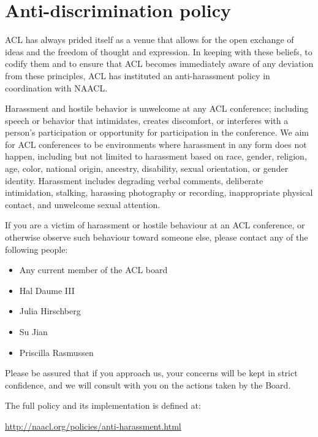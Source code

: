 \section[Anti-discrimination policy]{Anti-discrimination policy}
\thispagestyle{emptyheader}
\setheaders{}{}

ACL has always prided itself as a venue that allows for the open
exchange of ideas and the freedom of thought and expression. In
keeping with these beliefs, to codify them and to ensure that ACL
becomes immediately aware of any deviation from these principles, ACL
has instituted an anti-harassment policy in coordination with NAACL.

Harassment and hostile behavior is unwelcome at any ACL conference;
including speech or behavior that intimidates, creates discomfort, or
interferes with a person's participation or opportunity for
participation in the conference. We aim for ACL conferences to be
environments where harassment in any form does not happen, including
but not limited to harassment based on race, gender, religion, age,
color, national origin, ancestry, disability, sexual orientation, or
gender identity. Harassment includes degrading verbal comments,
deliberate intimidation, stalking, harassing photography or recording,
inappropriate physical contact, and unwelcome sexual attention.

If you are a victim of harassment or hostile behaviour at an ACL
conference, or otherwise observe such behaviour toward someone else,
please contact any of the following people:

\begin{itemize}
\item Any current member of the ACL board
\item Hal Daume III 
\item Julia Hirschberg 
\item Su Jian 
\item Priscilla Rasmussen 
\end{itemize}

Please be assured that if you approach us, your concerns will be kept
in strict confidence, and we will consult with you on the actions
taken by the Board.

The full policy and its implementation is defined at:

\url{http://naacl.org/policies/anti-harassment.html}
